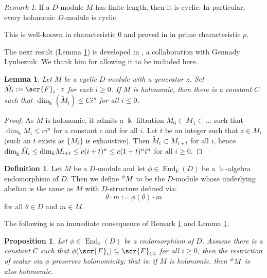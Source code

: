 \documentclass[11pt]{amsart}
\newtheorem{lemma}[theorem]{Lemma}
\newtheorem{proposition}[theorem]{Proposition}
\theoremstyle{definition}
\newtheorem{definition}[theorem]{Definition}
\theoremstyle{remark}
\newtheorem{remark}[theorem]{Remark}
\numberwithin{equation}{subsection}
\DeclareMathOperator{\kk}{\Bbbk}
\DeclareMathOperator{\End}{End}
\begin{document}
\begin{remark}
\label{holonomic is cyclic}
If a $D$-module $M$ has finite length, then it is cyclic. In particular, every holonomic $D$-module is cyclic. 

This is well-known in characteristic 0 and proved in \cite[Theorem 9.7]{BavulaHolonomic} in prime characteristic $p$. 
\end{remark}

The next result (Lemma \ref{filtration by generator}) is developed in \cite{LZ26}, a collaboration with Gennady Lyubeznik. We thank him for allowing it to be included here.

\begin{lemma}
\label{filtration by generator}
Let $M$ be a cyclic $D$-module with a generator $z$. Set $\tilde{M}_i:=\scr{F}_i\cdot z$ for each $i\geq 0$. If $M$ is holonomic, then there is a constant $C$ such that $\dim_{\kk}(\tilde{M}_i)\leq Ci^n$ for all $i\leq 0$.
\end{lemma}
\begin{proof}  
As $M$ is holonomic, it admits a $\kk$-filtration $M_0\subset M_1\subset\dots$ such that $\dim_{\kk}M_i\leq ci^n$ for a constant c and for all $i$. Let $t$ be an integer such that $z\in M_t$ (such an $t$ exists as $\{M_i\}$ is exhaustive). Then $\tilde{M}_i\subset M_{i+t}$ for all $i$, hence $\dim_{\kk}\tilde{M}_i\leq {\rm dim}_kM_{i+t}\leq c(i+t)^n\leq c(1+t)^ni^n$ for all $i\geq 0$.
\end{proof}

\begin{definition}
Let $M$ be a $D$-module and let $\phi\in \End_{\kk}(D)$ be a $\kk$-algebra endomorphism of $D$. Then we define $\prescript{\phi}{}M$ to be the $D$-module whose underlying abelian is the same as $M$ with $D$-structure defined via:
\[\theta\cdot m:=\phi(\theta)\cdot m\]
for all $\theta\in D$ and $m\in M$.
\end{definition}

The following is an immediate consequence of Remark \ref{holonomic is cyclic} and Lemma \ref{filtration by generator}.
\begin{proposition}
\label{holonomic criterion}
Let $\phi\in \End_{\kk}(D)$ be a endomorphism of $D$. Assume there is a constant $C$ such that $\phi(\scr{F}_i)\subseteq \scr{F}_{Ci}$ for all $i\geq 0$, then the restriction of scalar via $\phi$ preserves holonomicity; that is: if $M$ is holonomic. then $\prescript{\phi}{}M$ is also holonomic.
\end{proposition}
\end{document}
